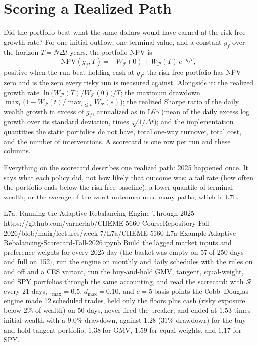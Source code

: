 \documentclass[11pt]{article}
\newcommand{\Rset}{\mathcal R}
\newcommand{\WP}{W_{\mathcal P}}
\begin{document}
\section{Scoring a Realized Path}

Did the portfolio beat what the same dollars would have earned at the risk-free growth rate? For one initial outflow, one terminal value, and a constant $g_f$ over the horizon $T=N\Delta t$ years, the portfolio NPV is
\begin{equation}
  \label{eq:npv}
  \mathrm{NPV}(g_f,T)=-\WP(0)+\WP(T)\,e^{-g_fT},
\end{equation}
positive when the run beat holding cash at $g_f$; the risk-free portfolio has NPV zero and is the zero every risky run is measured against. Alongside it: the realized growth rate $\ln\bigl(\WP(T)/\WP(0)\bigr)/T$; the maximum drawdown $\max_t\bigl(1-\WP(t)/\max_{s\le t}\WP(s)\bigr)$; the realized Sharpe ratio of the daily wealth growth in excess of $g_f$, annualized as in L6b (mean of the daily excess log growth over its standard deviation, times $\sqrt{1/\Delta t}$); and the implementation quantities the static portfolios do not have, total one-way turnover, total cost, and the number of interventions. A scorecard is one row per run and these columns.

Everything on the scorecard describes one realized path: 2025 happened once. It says what each policy did, not how likely that outcome was; a fail rate (how often the portfolio ends below the risk-free baseline), a lower quantile of terminal wealth, or the average of the worst outcomes need many paths, which is L7b.

\notebooklink
  {L7a: Running the Adaptive Rebalancing Engine Through 2025}
  {https://github.com/varnerlab/CHEME-5660-CourseRepository-Fall-2026/blob/main/lectures/week-7/L7a/CHEME-5660-L7a-Example-Adaptive-Rebalancing-Scorecard-Fall-2026.ipynb}
  {Build the lagged market inputs and preference weights for every 2025 day (the basket was empty on 57 of 250 days and full on 152), run the engine on monthly and daily schedules with the rules on and off and a CES variant, run the buy-and-hold GMV, tangent, equal-weight, and SPY portfolios through the same accounting, and read the scorecard: with $\Rset$ every 21 days, $\tau_{\max}=0.5$, $d_{\max}=0.10$, and $c=5$ basis points the Cobb--Douglas engine made 12 scheduled trades, held only the floors plus cash (risky exposure below 2\% of wealth) on 50 days, never fired the breaker, and ended at $1.53$ times initial wealth with a $9.0\%$ drawdown, against $1.28$ ($31\%$ drawdown) for the buy-and-hold tangent portfolio, $1.38$ for GMV, $1.59$ for equal weights, and $1.17$ for SPY.}
\end{document}
